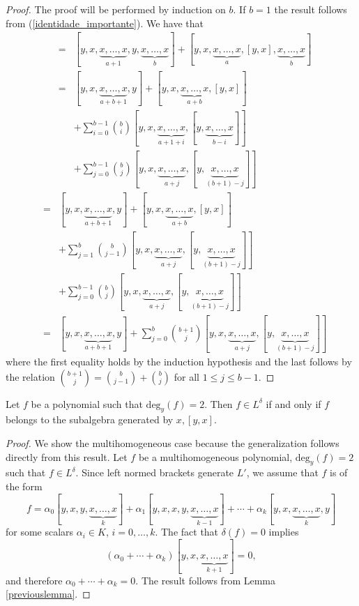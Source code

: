 \documentclass{cimart}
\begin{document}
\begin{proof} The proof will be performed  by induction on $b$. If $b = 1$ the result follows from (\ref{identidade_importante}).
We have that
\begin{eqnarray*}
[y, x, \underbrace{x, \ldots, x}_{a}, y, \underbrace{x, \ldots, x}_{b+1}]& = & [y, x, \underbrace{x, \ldots, x}_{a+ 1}, y, \underbrace{x, \ldots, x}_{b}] + [y, x, \underbrace{x, \ldots, x}_{a}, [y, x], \underbrace{x, \ldots, x}_{b}]\\
& = & [y, x, \underbrace{x, \ldots, x}_{a+ b + 1}, y ] + [y, x, \underbrace{x, \ldots, x}_{a+ b}, [y, x] ]\\
& & + \sum_{i = 0}^{b-1}  \binom{b}{i} [y, x, \underbrace{x, \ldots, x}_{a + 1 +  i}, [y, \underbrace{x, \ldots, x}_{b - i}]] \\
& & + \sum_{j = 0}^{b-1}  \binom{b}{j} [y, x, \underbrace{x, \ldots, x}_{a + j}, [y, \underbrace{x, \ldots, x}_{(b + 1) - j}]]
\end{eqnarray*}
\begin{eqnarray*}
& = & [y, x, \underbrace{x, \ldots, x}_{a+ b + 1}, y ] + [y, x, \underbrace{x, \ldots, x}_{a+ b}, [y, x] ]\\
& & + \sum_{j = 1}^{b}  \binom{b}{j-1} [y, x, \underbrace{x, \ldots, x}_{a + j}, [y, \underbrace{x, \ldots, x}_{(b+1) - j}]]  \\
& & + \sum_{j = 0}^{b-1}  \binom{b}{j} [y, x, \underbrace{x, \ldots, x}_{a + j}, [y, \underbrace{x, \ldots, x}_{(b + 1) - j}]] \\
& = &[y, x,  \underbrace{x, \ldots, x}_{a+ b+ 1}, y] + \sum_{j = 0}^{b}  \binom{b+ 1}{j} [y, x, \underbrace{x, \ldots, x}_{a + j}, [y, \underbrace{x, \ldots, x}_{(b+1) - j}]]
\end{eqnarray*}
where the first equality holds by the induction hypothesis and the last follows by the relation $ \binom{b+ 1}{j} =  \binom{b}{j-1} +  \binom{b}{j}$ for all $1 \leq j \leq b - 1$.
\end{proof}

\begin{corollary}\label{previouscorollary}
Let $f$ be a polynomial such that $\mbox{deg}_y(f) = 2$. Then $f\in L^{\delta}$ if and only if $f $ belongs to the subalgebra generated by $x, [y, x]$.
\end{corollary}
\begin{proof} We show the multihomogeneous case because the generalization follows directly from this result. Let $f$ be a multihomogeneous polynomial, $\mbox{deg}_y(f) = 2$ such that $f \in L^\delta$.
Since left normed  brackets generate $L'$, we assume that $f$ is of the form
$$f = \alpha_0 [y, x, y, \underbrace{x, \ldots, x}_{k}] + \alpha_1 [y, x, x, y, \underbrace{x, \ldots, x}_{k-1}] + \cdots + \alpha_k [y, x, \underbrace{x, \ldots, x}_{k}, y]$$
for some scalars $\alpha_i\in K$, $i=0,\ldots,k$. The fact that $\delta(f) = 0$ implies 
$$(\alpha_0 + \cdots + \alpha_k)[y, x, \underbrace{x, \ldots, x}_{k + 1}] = 0,$$
and therefore $\alpha_0 + \cdots + \alpha_k = 0$. The result follows from Lemma \ref{previouslemma}.
\end{proof}
\end{document}
